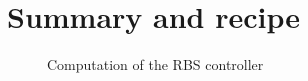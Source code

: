 \section{Summary and recipe}

\begin{figure}
 \centering
 \newcommand{\macSysCoord}{$\sysCoord, \sysVel, \kinMat$}
 \newcommand{\macBodyCoord}{$\{\bodyHomoCoord{\BidxI}{\BidxII}\}$}
 \newcommand{\macPlantParamOne}{$\{\bodyInertiaMat{0}{\BidxII}, \bodyDissMat{\BidxI}{\BidxII}, \bodyStiffMat{\BidxI}{\BidxII}\}$}
 \newcommand{\macPlantParamTwo}{$\{\bodyHomoCoord{\BidxI}{\BidxII}_0\}, \gravityAcc$}
 \newcommand{\macCtrlParamOne}{$\{\bodyInertiaMatC{\BidxI}{\BidxII}, \bodyDissMatC{\BidxI}{\BidxII}, \bodyStiffMatC{\BidxI}{\BidxII}\}$}
 \newcommand{\macCtrlParamTwo}{$\sysCoordR, \sysVelR, \sysVelRd$}
 \newcommand{\macBodyJac}{$\{\bodyHomoCoord{\BidxI}{\BidxII}, \bodyJac{\BidxI}{\BidxII}, \bodyJacd{\BidxI}{\BidxII}\}$}
 \newcommand{\macPlantKineticsMats}{$\sysInertiaMat, \sysForce, \sysInputMat$}
 \newcommand{\macClosedLoopKineticsMats}{$\sysInertiaMatC, \sysForceC$}
 \newcommand{\macCtrlOut}{$\sysInput_0$}
 \newcommand{\macMatchingOut}{$\tuple{\lambda}$}
 \newcommand{\macMatchingIn}{$\sysInputMatLComp$}
 \newcommand{\macTransportMapIn}{$\sysTransportMap$}
 \newcommand{\macTotalEnergyOut}{$\totalEnergyC$}
 
 \caption{Computation of the RBS controller}
 \label{fig:CtrlSummaryBlock}
\end{figure}


